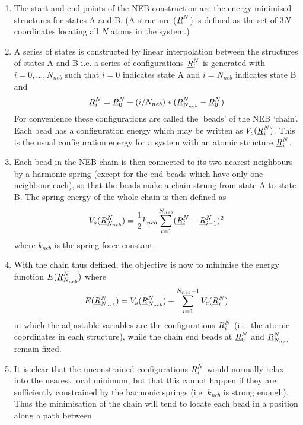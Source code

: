 \begin{enumerate}
\item The start and end points of the NEB construction are the energy
minimised structures for states A and B. (A structure ($\mbox{$\underline{R}$}^{N}$) is
defined as the set of $3N$ coordinates locating all $N$ atoms in the system.)
\item A series of states is constructed by linear interpolation between the
structures of states A and B i.e. a series of configurations
$\mbox{$\underline{R}$}^{N}_{i}$ is generated with $i=0,\ldots,N_{neb}$ such that $i=0$
indicates state A and $i=N_{neb}$ indicates state B and
\begin{equation}
\mbox{$\underline{R}$}^{N}_{i}=\mbox{$\underline{R}$}^{N}_{0}+(i/N_{neb})*(\mbox{$\underline{R}$}^{N}_{N_{neb}}-\mbox{$\underline{R}$}^{N}_{0})
\end{equation}
For convenience these configurations are called the `beads' of the NEB
`chain'. Each bead has a configuration energy which may be written as
$V_{c}(\mbox{$\underline{R}$}^{N}_{i})$. This is the usual configuration energy for a
system with an atomic structure $\mbox{$\underline{R}$}^{N}_{i}$.
\item Each bead in the NEB chain  is then connected to its two 
nearest neighbours by a harmonic spring (except for the end beads which
have only one neighbour each), so that the beads make a chain strung 
from state A to state B. The spring energy of the whole chain is 
then defined as
\begin{equation}
V_{s}(\mbox{$\underline{R}$}^{N}_{N_{neb}})=\frac{1}{2}k_{neb}\sum_{i=1}^{N_{neb}}(\mbox{$\underline{R}$}^{N}_{i}-\mbox{$\underline{R}$}^{N}_{i-1})^{2}
\end{equation}
where $k_{neb}$ is the spring force constant.
\item With the chain thus defined, the objective is now to minimise
the energy function $E(\mbox{$\underline{R}$}^{N}_{N_{neb}})$ where
\begin{equation}
E(\mbox{$\underline{R}$}^{N}_{N_{neb}})=V_{s}(\mbox{$\underline{R}$}^{N}_{N_{neb}})+\sum_{i=1}^{N_{neb}-1}V_{c}(\mbox{$\underline{R}$}^{N}_{i})
\end{equation}
in which the adjustable variables are the configurations $\mbox{$\underline{R}$}^{N}_{i}$
(i.e. the atomic coordinates in each structure), while the chain end
beads at $\mbox{$\underline{R}$}^{N}_{0}$ and $\mbox{$\underline{R}$}^{N}_{N_{neb}}$ remain fixed.
\item It is clear that the unconstrained configurations $\mbox{$\underline{R}$}^{N}_{i}$ would
normally relax into the nearest local minimum, but that this cannot
happen if they are sufficiently constrained by the harmonic springs
(i.e. $k_{neb}$ is strong enough). Thus the minimisation of the chain
will tend to locate each bead in a position along a path between

\end{enumerate}
